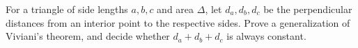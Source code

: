 For a triangle of side lengths $a,b,c$ and area $\Delta$, let $d_a,d_b,d_c$ be the perpendicular distances from an interior point to the respective sides. Prove a generalization of Viviani's theorem, and decide whether $d_a+d_b+d_c$ is always constant.
